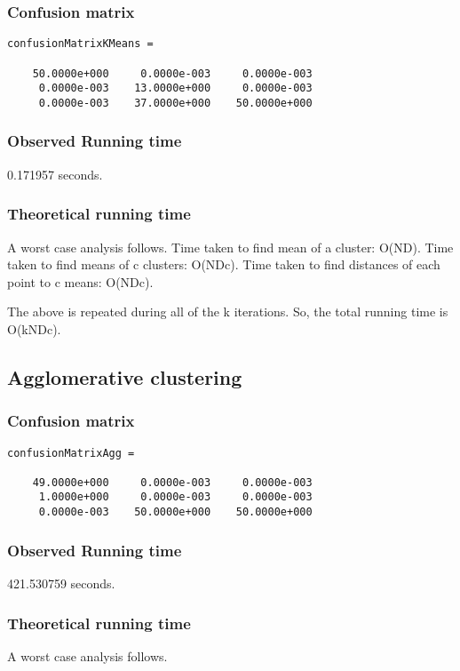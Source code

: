 \documentclass{article}
\begin{document}
\subsubsection{Confusion matrix}
\begin{verbatim}
confusionMatrixKMeans =

    50.0000e+000     0.0000e-003     0.0000e-003
     0.0000e-003    13.0000e+000     0.0000e-003
     0.0000e-003    37.0000e+000    50.0000e+000
\end{verbatim}

\subsubsection{Observed Running time}
0.171957 seconds.

\subsubsection{Theoretical running time}
A worst case analysis follows. Time taken to find mean of a cluster: O(ND). Time taken to find means of c clusters: O(NDc). Time taken to find distances of each point to c means: O(NDc).

The above is repeated during all of the k iterations. So, the total running time is O(kNDc).

\subsection{Agglomerative clustering}
\subsubsection{Confusion matrix}
\begin{verbatim}
confusionMatrixAgg =

    49.0000e+000     0.0000e-003     0.0000e-003
     1.0000e+000     0.0000e-003     0.0000e-003
     0.0000e-003    50.0000e+000    50.0000e+000
\end{verbatim}

\subsubsection{Observed Running time}
421.530759 seconds.

\subsubsection{Theoretical running time}
A worst case analysis follows.
\end{document}
